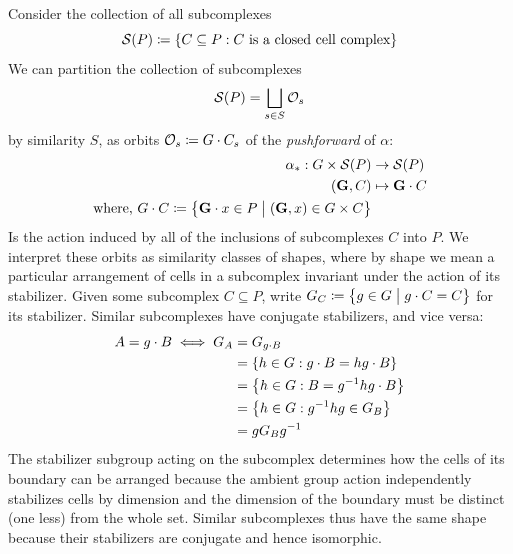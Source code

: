 \documentclass{amsart}
\theoremstyle{plain}
\theoremstyle{definition}
\begin{document}
 Consider the collection of all subcomplexes
 \begin{equation}\label{def:subc}
     \mathcal{S}(P)\coloneqq\left\{C\subseteq P:C\text{ is a closed cell complex}\right\}
 \end{equation}
We can partition the collection of subcomplexes 
\begin{equation}
    \mathcal{S}(P)=\bigsqcup_{s\in S}\mathcal{O}_s
\end{equation}
 by similarity $S$, as orbits $\mathcal{O}_s\coloneqq G\cdot C_s$ of the \emph{pushforward} of $\alpha$:
 \begin{align}
     \alpha_*:G\times\mathcal{S}(P)&\to \mathcal{S}(P)\\
     (\mathbf{G}, C)&\mapsto \mathbf{G}\cdot C\nonumber\\
     \text{where, } G\cdot C\coloneqq \left\{\mathbf{G}\cdot x\in P\hspace{1mm}\big|\hspace{1mm}(\mathbf{G}, x)\in G\times C\right\}\nonumber
 \end{align}
 Is the action induced by all of the inclusions of subcomplexes $C$ into $P$. We interpret these orbits as similarity classes of shapes, where by shape we mean a particular arrangement of cells in a subcomplex invariant under the action of its stabilizer. Given some subcomplex $C\subseteq P$, write $G_C\coloneqq\left\{g\in G\hspace{1mm}\big|\hspace{1mm} g\cdot C = C\right\}$ for its stabilizer. Similar subcomplexes have conjugate stabilizers, and vice versa:
 \begin{align*}
     A=g\cdot B\iff G_A &= G_{g\cdot B}\\
     &=\left\{h\in G:g\cdot B = hg\cdot B\right\}\\
     &=\left\{h\in G: B = g^{-1}hg\cdot B\right\}\\
     &=\left\{h\in G:g^{-1}hg\in G_B\right\}\\
     &=gG_Bg^{-1}
 \end{align*}
 The stabilizer subgroup acting on the subcomplex determines how the cells of its boundary can be arranged because the ambient group action independently stabilizes cells by dimension and the dimension of the boundary must be distinct (one less) from the whole set. Similar subcomplexes thus have the same shape because their stabilizers are conjugate and hence isomorphic.
 
\end{document}
